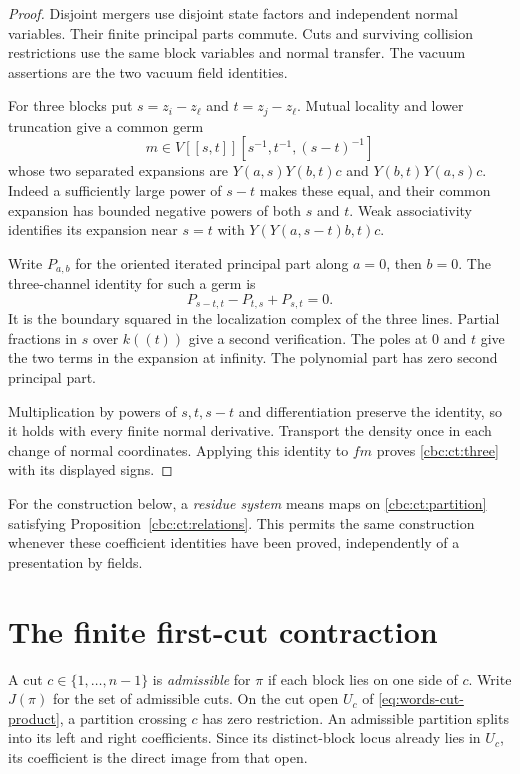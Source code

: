 \begin{proof}
Disjoint mergers use disjoint state factors and independent normal
variables. Their finite principal parts commute. Cuts and surviving
collision restrictions use the same block variables and normal
transfer. The vacuum assertions are the two vacuum field identities.

For three blocks put $s=z_i-z_\ell$ and $t=z_j-z_\ell$.
Mutual locality and lower truncation give a common germ
\[
 m\in V[[s,t]][s^{-1},t^{-1},(s-t)^{-1}]
\]
whose two separated expansions are $Y(a,s)Y(b,t)c$ and
$Y(b,t)Y(a,s)c$. Indeed a sufficiently large power of $s-t$
makes these equal, and their common expansion has bounded negative
powers of both $s$ and $t$. Weak associativity identifies its
expansion near $s=t$ with $Y(Y(a,s-t)b,t)c$.

Write $P_{a,b}$ for the oriented iterated principal part along
$a=0$, then $b=0$. The three-channel identity for such a germ is
\[
 P_{s-t,t}-P_{t,s}+P_{s,t}=0.
\]
It is the boundary squared in the localization complex of the
three lines. Partial fractions in $s$ over $k((t))$ give a
second verification. The poles at $0$ and $t$ give the two
terms in the expansion at infinity. The polynomial part has
zero second principal part.

Multiplication by powers of $s,t,s-t$ and differentiation
preserve the identity, so it holds with every finite normal
derivative. Transport the density once in each change of normal
coordinates. Applying this identity to $fm$ proves
\eqref{cbc:ct:three} with its displayed signs.
\end{proof}

For the construction below, a \emph{residue system} means maps
on \eqref{cbc:ct:partition} satisfying
Proposition~\ref{cbc:ct:relations}. This permits the same
construction whenever these coefficient identities have been
proved, independently of a presentation by fields.

\section{The finite first-cut contraction}
\label{cbc:ct:contraction}

A cut $c\in\{1,\ldots,n-1\}$ is \emph{admissible} for
$\pi$ if each block lies on one side of $c$. Write $J(\pi)$
for the set of admissible cuts. On the cut open $U_c$ of
\eqref{eq:words-cut-product}, a partition crossing $c$ has zero
restriction. An admissible partition splits into its left and
right coefficients. Since its distinct-block locus already lies
in $U_c$, its coefficient is the direct image from that open.

